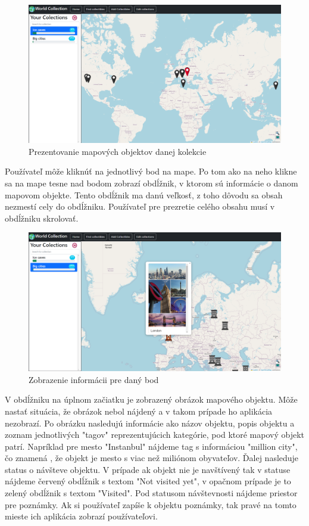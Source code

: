 \begin{figure}[h]
      \includegraphics[width=140mm]{../img/ud-mapa-s-bodmy}
      \centering
      \caption{Prezentovanie mapových objektov danej kolekcie}
\end{figure}

Používateľ môže kliknúť na jednotlivý bod na mape. Po tom ako na neho klikne sa na mape tesne nad bodom zobrazí obdĺžnik, v ktorom sú informácie o danom mapovom objekte.
Tento obdĺžnik ma danú veľkosť, z toho dôvodu sa obsah nezmestí cely do obdĺžniku. Používateľ pre prezretie celého obsahu musí v obdĺžniku skrolovať.

\begin{figure}[h]
      \includegraphics[width=140mm]{../img/ud-obdznik_obrazok}
      \centering
      \caption{Zobrazenie informácii pre daný bod }
\end{figure}

V obdĺžniku na úplnom začiatku je zobrazený obrázok mapového objektu.
Môže nastať situácia, že obrázok nebol nájdený a v takom prípade ho aplikácia nezobrazí. Po obrázku nasledujú informácie ako názov objektu, popis objektu a zoznam jednotlivých "tagov" reprezentujúcich kategórie,
pod ktoré mapový objekt patrí. Napríklad pre mesto "Instanbul" nájdeme tag s informáciou "million city", čo znamená , že objekt je mesto s viac než miliónom obyvateľov.
Ďalej nasleduje status o návšteve objektu. V prípade ak objekt nie je navštívený tak v statuse nájdeme červený obdĺžnik s textom "Not visited yet", v opačnom prípade je to zelený
obdĺžnik s textom "Visited". Pod statusom návštevnosti nájdeme priestor pre poznámky. Ak si používateľ zapíše k objektu poznámky, tak pravé na tomto mieste ich aplikácia zobrazí používateľovi.

